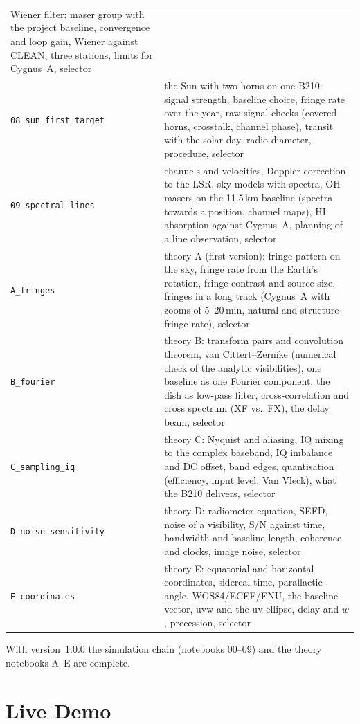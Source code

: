 \begin{center}
\begin{tabular}{@{}l>{\raggedright\arraybackslash}p{9.6cm}@{}}
  Wiener filter: maser group with the project baseline, convergence and
  loop gain, Wiener against CLEAN, three stations, limits for Cygnus~A,
  selector \\
\texttt{08\_sun\_first\_target} & the Sun with two horns on one B210:
  signal strength, baseline choice, fringe rate over the year, raw-signal
  checks (covered horns, crosstalk, channel phase), transit with the solar
  day, radio diameter, procedure, selector \\
\texttt{09\_spectral\_lines} & channels and velocities, Doppler correction
  to the LSR, sky models with spectra, OH masers on the 11.5\,km baseline
  (spectra towards a position, channel maps), HI absorption against
  Cygnus~A, planning of a line observation, selector \\
\texttt{A\_fringes} & theory A (first version): fringe pattern on the
  sky, fringe rate from the Earth's rotation, fringe contrast and source
  size, fringes in a long track (Cygnus~A with zooms of 5--20\,min,
  natural and structure fringe rate), selector \\
\texttt{B\_fourier} & theory B: transform pairs and convolution theorem,
  van Cittert--Zernike (numerical check of the analytic visibilities), one
  baseline as one Fourier component, the dish as low-pass filter,
  cross-correlation and cross spectrum (XF vs.\ FX), the delay beam,
  selector \\
\texttt{C\_sampling\_iq} & theory C: Nyquist and aliasing, IQ mixing to the
  complex baseband, IQ imbalance and DC offset, band edges, quantisation
  (efficiency, input level, Van Vleck), what the B210 delivers, selector \\
\texttt{D\_noise\_sensitivity} & theory D: radiometer equation, SEFD, noise
  of a visibility, S/N against time, bandwidth and baseline length,
  coherence and clocks, image noise, selector \\
\texttt{E\_coordinates} & theory E: equatorial and horizontal coordinates,
  sidereal time, parallactic angle, WGS84/ECEF/ENU, the baseline vector,
  uvw and the uv-ellipse, delay and $w$, precession, selector \\
\bottomrule
\end{tabular}
\end{center}
With version~1.0.0 the simulation chain (notebooks 00--09) and the theory
notebooks A--E are complete.

\section{Live Demo}

